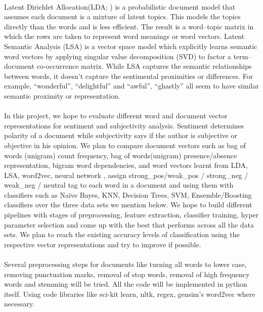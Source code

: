 \documentclass[11pt, oneside]{article}
\begin{document}
\paragraph{}
Latent Dirichlet Allocation(LDA; \cite{blei2003latent}) is a probabilistic document model that assumes each document is a mixture of latent topics. This models the topics directly than the words and is less efficient. The result is a word–topic matrix in which the rows are taken to represent word meanings or word vectors. Latent Semantic Analysis (LSA) is a vector space model which explicitly learns semantic word vectors by applying singular value decomposition (SVD) to factor a term–document co-occurrence matrix. While LSA captures the semantic relationships between words, it doesn’t capture the sentimental proximities or differences. For example, ``wonderful'', ``delightful'' and ``awful'', ``ghastly'' all seem to have similar semantic proximity or representation.
\paragraph{}
In this project, we hope to evaluate different word and document vector representations for sentiment and subjectivity analysis. Sentiment determines polarity of a document while subjectivity says if the author is subjective or objective in his opinion. We plan to compare document vectors such as bag of words (unigram) count frequency, bag of words(unigram) presence/absence representation, bigram word dependencies, and word vectors learnt from LDA, LSA, word2vec, neural network , assign strong\_pos/weak\_pos / strong\_neg / weak\_neg / neutral tag to each word in a document and using them with classifiers such as Naïve Bayes, KNN, Decision Trees, SVM, Ensemble/Boosting classifiers over the three data sets we mention below. We hope to build different pipelines with stages of preprocessing, feature extraction, classifier training, hyper parameter selection and come up with the best that performs across all the data sets. We plan to reach the existing accuracy levels of classification using the respective vector representations and try to improve if possible.
\paragraph{}
Several preprocessing steps for documents like turning all words to lower case, removing punctuation marks, removal of stop words, removal of high frequency words and stemming will be tried. All the code will be implemented in python itself. Using code libraries like sci-kit learn, nltk, regex, gensim’s word2vec where necessary.


\end{document}
